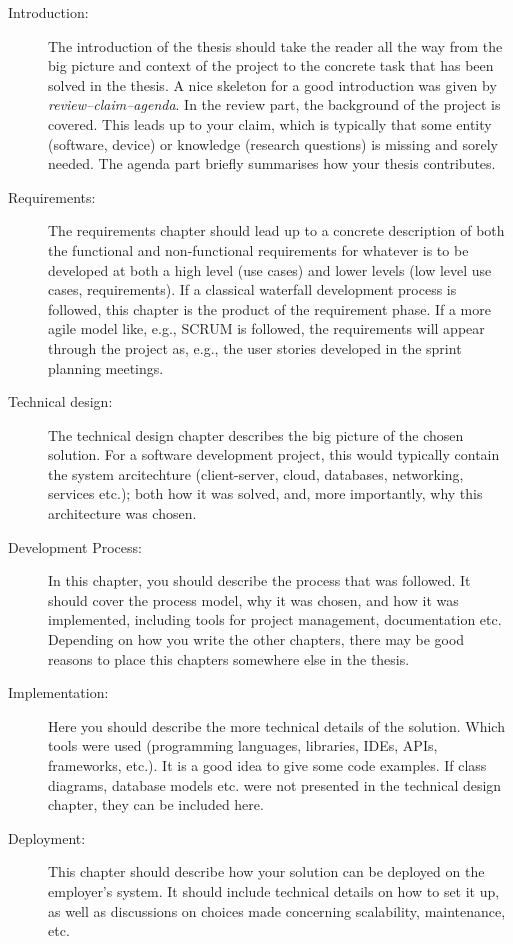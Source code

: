 \begin{description}
    \item[Introduction:] The introduction of the thesis should take the reader all the way from the big picture and context of the project to the concrete task that has been solved in the thesis. A nice skeleton for a good introduction was given by \emph{review–claim–agenda}. In the review part, the background of the project is covered. This leads up to your claim, which is typically that some entity (software, device) or knowledge (research questions) is missing and sorely needed. The agenda part briefly summarises how your thesis contributes.
    \item[Requirements:] The requirements chapter should lead up to a concrete description of both the functional and non-functional requirements for whatever is to be developed at both a high level (use cases) and lower levels (low level use cases, requirements). If a classical waterfall development process is followed, this chapter is the product of the requirement phase. If a more agile model like, e.g., SCRUM is followed, the requirements will appear through the project as, e.g., the user stories developed in the sprint planning meetings.
    \item[Technical design:] The technical design chapter describes the big picture of the chosen solution. For a software development project, this would typically contain the system arcitechture (client-server, cloud, databases, networking, services etc.); both how it was solved, and, more importantly, why this architecture was chosen.
    \item[Development Process:] In this chapter, you should describe the process that was followed. It should cover the process model, why it was chosen, and how it was implemented, including tools for project management, documentation etc. Depending on how you write the other chapters, there may be good reasons to place this chapters somewhere else in the thesis.
    \item[Implementation:] Here you should describe the more technical details of the solution. Which tools were used (programming languages, libraries, IDEs, APIs, frameworks, etc.). It is a good idea to give some code examples. If class diagrams, database models etc. were not presented in the technical design chapter, they can be included here.
    \item[Deployment:] This chapter should describe how your solution can be deployed on the employer's system. It should include technical details on how to set it up, as well as discussions on choices made concerning scalability, maintenance, etc.

\end{description}
